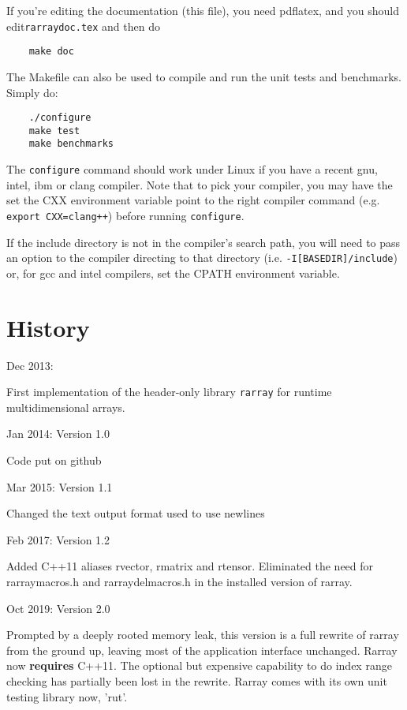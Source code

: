 \documentclass[11pt,twoside]{article}
\begin{document}
If you're editing the documentation (this file), you need pdflatex, and you should edit\linebreak \texttt{rarraydoc.tex} and then do
\begin{verbatim}
    make doc
\end{verbatim}

The Makefile can also be used to compile and run the unit tests and benchmarks. Simply do:
\begin{verbatim}
    ./configure
    make test
    make benchmarks
\end{verbatim}
The \texttt{configure} command should work under Linux if you have a recent
gnu, intel, ibm or clang compiler.  Note that to pick your compiler,
you may have the set the CXX environment variable point to the right
compiler command (e.g. \texttt{export CXX=clang++}) before running \texttt{configure}.

If the include directory is not in the compiler's search path, you
will need to pass an option to the compiler directing to that
directory (i.e. \texttt{-I[BASEDIR]/include}) or, for gcc and intel compilers,
set the CPATH environment variable.

\newpage

\section{History}

Dec 2013:

First implementation of the header-only library \texttt{rarray} for runtime multidimensional arrays.

\noindent
Jan 2014: Version 1.0

Code put on github

\noindent
Mar 2015: Version 1.1

Changed the text output format used to use newlines

\noindent
Feb 2017: Version 1.2

Added C++11 aliases rvector, rmatrix and rtensor. Eliminated the need
for rarraymacros.h and rarraydelmacros.h in the installed version of
rarray.

\noindent
Oct 2019: Version 2.0

Prompted by a deeply rooted memory leak, this version is a full
rewrite of rarray from the ground up, leaving most of the application
interface unchanged.  Rarray now \textbf{requires} C++11.
The optional but expensive capability to do index range checking has
partially been lost in the rewrite.  Rarray comes with its own unit testing
library now, 'rut'.
\end{document}
